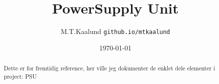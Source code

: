 \documentclass[11pt,a4paper,twoside]{article}
\begin{document}
\title{PowerSupply Unit}
\author{M.T.Kaalund \texttt{github.io/mtkaalund}}
\date{\today}

\maketitle

\begin{abstract}
Dette er for fremtidig reference, her ville jeg dokumenter de enklet dele elementer i project: PSU
\end{abstract}

\tableofcontents







\end{document}
